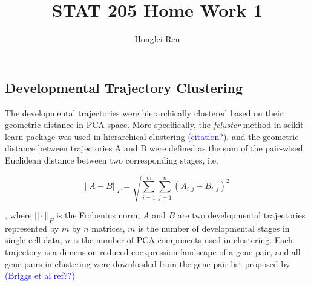 \documentclass[12pt]{article}
\title{STAT 205 Home Work 1}
\author{Honglei Ren}
\begin{document}
\maketitle

\subsection{Developmental Trajectory Clustering}
The developmental trajectories were hierarchically clustered based on their geometric distance in PCA space. More specifically, the \textit{fcluster} method in scikit-learn package was used in hierarchical clustering \textcolor{blue}{(citation?)}, and the geometric distance between trajectories A and B were defined as the sum of the pair-wised Euclidean distance between two corresponding stages, i.e. 


\begin{equation}
||A - B||_F = \sqrt{\sum_{i=1}^{m} \sum_{j=1}^{n} (A_{i, j}- B_{i,j})^2}
\label{eq:traj_dist}
\end{equation}

, where $||\cdot||_F$ is the Frobenius norm, $A$ and $B$ are two developmental trajectories represented by $m$ by $n$ matrices, $m$ is the number of developmental stages in single cell data, $n$ is the number of PCA components used in clustering. Each trajectory is a dimension reduced coexpression landscape of a gene pair, and all gene pairs in clustering were downloaded from the gene pair list proposed by \textcolor{blue}{(Briggs et al ref??)}
\end{document}
